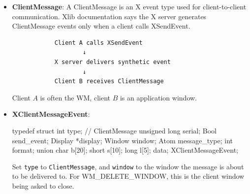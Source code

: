 \documentclass{report}
\begin{document}
\begin{itemize}
\begin{itemize}
                \bigbreak \noindent 
                ICCCM says WMs should not use DestroyWindow on a window that has WM\_DELETE\_WINDOW in WM\_PROTOCOLS.
            \item \textbf{WM\_TAKE\_FOCUS}: Used for focus negotiation. The WM sends a \texttt{ClientMessage} saying "You may take keyboard focus now, using this timestamp."
                \bigbreak \noindent 
                The client may then call XSetInputFocus on itself or one of its child windows.
                \bigbreak \noindent 
                This is used by clients that need control over their internal focus behavior.
            \item \textbf{\_NET\_WM\_PING}: This is EWMH, not old ICCCM, but it also uses WM_PROTOCOLS.
                \bigbreak \noindent 
                A client can list \_NET\_WM\_PING in WM\_PROTOCOLS. The WM can use it to check whether the client is still processing events, especially after a close request seems to hang.
        \end{itemize}
    \item \textbf{ClientMessage}: A ClientMessage is an X event type used for client-to-client communication. Xlib documentation says the X server generates ClientMessage events only when a client calls XSendEvent.
        \begin{verbatim}
            Client A calls XSendEvent
                    ↓
            X server delivers synthetic event
                    ↓
            Client B receives ClientMessage
        \end{verbatim}
        Client $A$ is often the WM, client $B$ is an application window.
    \item \textbf{XClientMessageEvent}: 
        \bigbreak \noindent 
        \begin{cppcode}
            typedef struct {
                int type;               // ClientMessage
                unsigned long serial;
                Bool send_event;
                Display *display;
                Window window;
                Atom message_type;
                int format;
                union {
                    char b[20];
                    short s[10];
                    long l[5];
                } data;
            } XClientMessageEvent;
        \end{cppcode}
        \bigbreak \noindent 
        Set \texttt{type} to \texttt{ClientMessage}, and \texttt{window} to the window the message is about to be delivered to. For WM\_DELETE\_WINDOW, this is the client window being asked to close.

\end{itemize}
\end{document}
